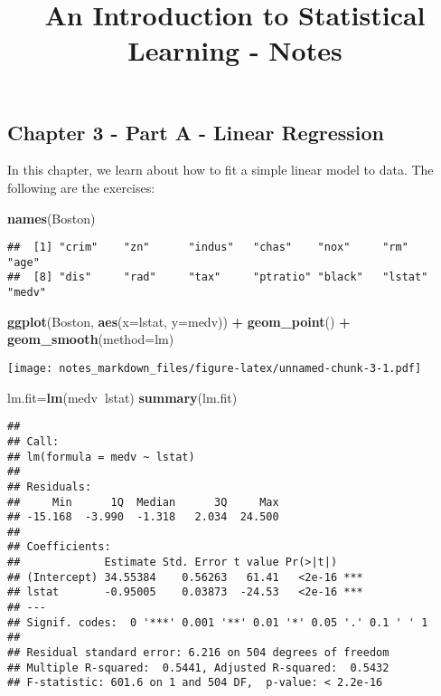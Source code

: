 \documentclass[]{article}
\title{An Introduction to Statistical Learning - Notes}
\author{}
\date{}
\newenvironment{Shaded}{\begin{snugshade}}{\end{snugshade}}
\newcommand{\KeywordTok}[1]{\textcolor[rgb]{0.13,0.29,0.53}{\textbf{#1}}}
\newcommand{\DataTypeTok}[1]{\textcolor[rgb]{0.13,0.29,0.53}{#1}}
\newcommand{\StringTok}[1]{\textcolor[rgb]{0.31,0.60,0.02}{#1}}
\newcommand{\OperatorTok}[1]{\textcolor[rgb]{0.81,0.36,0.00}{\textbf{#1}}}
\newcommand{\NormalTok}[1]{#1}
\begin{document}
\maketitle

\subsection{Chapter 3 - Part A - Linear
Regression}\label{chapter-3---part-a---linear-regression}

In this chapter, we learn about how to fit a simple linear model to
data. The following are the exercises:

\begin{Shaded}
\begin{Highlighting}[]
\KeywordTok{names}\NormalTok{(Boston)}
\end{Highlighting}
\end{Shaded}

\begin{verbatim}
##  [1] "crim"    "zn"      "indus"   "chas"    "nox"     "rm"      "age"    
##  [8] "dis"     "rad"     "tax"     "ptratio" "black"   "lstat"   "medv"
\end{verbatim}

\begin{Shaded}
\begin{Highlighting}[]
\KeywordTok{ggplot}\NormalTok{(Boston, }\KeywordTok{aes}\NormalTok{(}\DataTypeTok{x=}\NormalTok{lstat, }\DataTypeTok{y=}\NormalTok{medv)) }\OperatorTok{+}\StringTok{ }\KeywordTok{geom_point}\NormalTok{() }\OperatorTok{+}\StringTok{ }\KeywordTok{geom_smooth}\NormalTok{(}\DataTypeTok{method=}\NormalTok{lm)}
\end{Highlighting}
\end{Shaded}

\texttt{[image: notes\_markdown\_files/figure-latex/unnamed-chunk-3-1.pdf]}

\begin{Shaded}
\begin{Highlighting}[]
\NormalTok{lm.fit=}\KeywordTok{lm}\NormalTok{(medv}\OperatorTok{~}\NormalTok{lstat)}
\KeywordTok{summary}\NormalTok{(lm.fit)}
\end{Highlighting}
\end{Shaded}

\begin{verbatim}
## 
## Call:
## lm(formula = medv ~ lstat)
## 
## Residuals:
##     Min      1Q  Median      3Q     Max 
## -15.168  -3.990  -1.318   2.034  24.500 
## 
## Coefficients:
##             Estimate Std. Error t value Pr(>|t|)    
## (Intercept) 34.55384    0.56263   61.41   <2e-16 ***
## lstat       -0.95005    0.03873  -24.53   <2e-16 ***
## ---
## Signif. codes:  0 '***' 0.001 '**' 0.01 '*' 0.05 '.' 0.1 ' ' 1
## 
## Residual standard error: 6.216 on 504 degrees of freedom
## Multiple R-squared:  0.5441, Adjusted R-squared:  0.5432 
## F-statistic: 601.6 on 1 and 504 DF,  p-value: < 2.2e-16
\end{verbatim}
\end{document}

